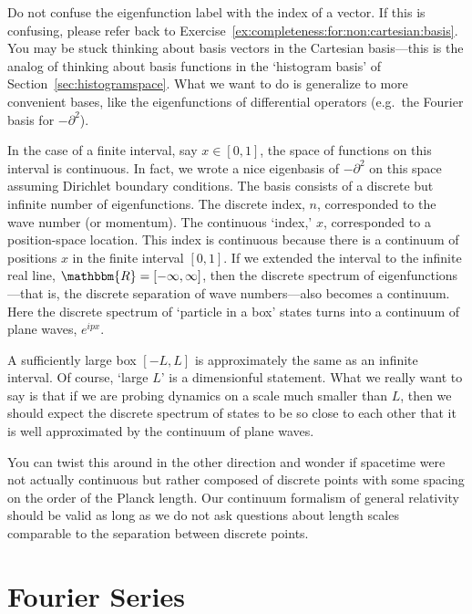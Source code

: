 Do not confuse the eigenfunction label with the index of a vector. If this is confusing, please refer back to Exercise~\ref{ex:completeness:for:non:cartesian:basis}. You may be stuck thinking about basis vectors in the Cartesian basis---this is the analog of thinking about basis functions in the `histogram basis' of Section~\ref{sec:histogramspace}. What we want to do is generalize to more convenient bases, like the eigenfunctions of differential operators (e.g.~the Fourier basis for $-\partial^2$).

\begin{example}
In the case of a finite interval, say $x\in [0,1]$, the space of functions on this interval is continuous. In fact, we wrote a nice eigenbasis of $-\partial^2$ on this space assuming Dirichlet boundary conditions. The basis consists of a discrete but infinite number of eigenfunctions. The discrete index, $n$, corresponded to the wave number (or momentum). The continuous `index,' $x$, corresponded to a position-space location. This index is continuous because there is a continuum of positions $x$ in the finite interval $[0,1]$. If we extended the interval to the infinite real line, $\mathbbm{R} = [-\infty, \infty]$, then the discrete spectrum of eigenfunctions---that is, the discrete separation of wave numbers---also becomes a continuum. Here the discrete spectrum of `particle in a box' states turns into a continuum of plane waves, $e^{ipx}$. 

A sufficiently large box $[-L,L]$ is approximately the same as an infinite interval. Of course, `large $L$' is a dimensionful statement. What we really want to say is that if we are probing dynamics on a scale much smaller than $L$, then we should expect the discrete spectrum of states to be so close to each other that it is well approximated by the continuum of plane waves. 

You can twist this around in the other direction and wonder if spacetime were not actually continuous but rather composed of discrete points with some spacing on the order of the Planck length. Our continuum formalism of general relativity should be valid as long as we do not ask questions about length scales comparable to the separation between discrete points. 
\end{example}

\section{Fourier Series}

